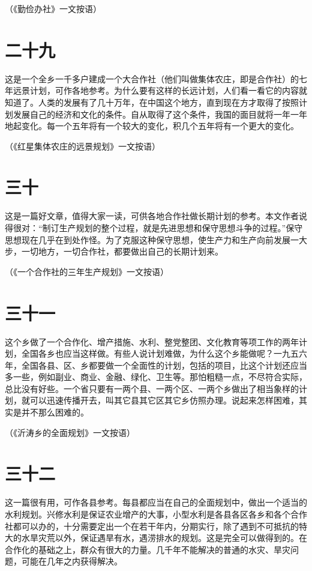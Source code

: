 （《勤俭办社》一文按语）

\section*{二十九}

这是一个全乡一千多户建成一个大合作社（他们叫做集体农庄，即是合作社）的七年远景计划，可作各地参考。为什么要有这样的长远计划，人们看一看它的内容就知道了。人类的发展有了几十万年，在中国这个地方，直到现在方才取得了按照计划发展自己的经济和文化的条件。自从取得了这个条件，我国的面目就将一年一年地起变化。每一个五年将有一个较大的变化，积几个五年将有一个更大的变化。


（《红星集体农庄的远景规划》一文按语）

\section*{三十}

这是一篇好文章，值得大家一读，可供各地合作社做长期计划的参考。本文作者说得很对：“制订生产规划的整个过程，就是先进思想和保守思想斗争的过程。”保守思想现在几乎在到处作怪。为了克服这种保守思想，使生产力和生产向前发展一大步，一切地方，一切合作社，都要做出自己的长期计划来。


（《一个合作社的三年生产规划》一文按语）

\section*{三十一}

这个乡做了一个合作化、增产措施、水利、整党整团、文化教育等项工作的两年计划，全国各乡也应当这样做。有些人说计划难做，为什么这个乡能做呢？一九五六年，全国各县、区、乡都要做一个全面性的计划，包括的项目，比这个计划还应当多一些，例如副业、商业、金融、绿化、卫生等。那怕粗糙一点，不尽符合实际，总比没有好些。一个省只要有一两个县、一两个区、一两个乡做出了相当象样的计划，就可以迅速传播开去，叫其它县其它区其它乡仿照办理。说起来怎样困难，其实是并不那么困难的。


（《沂涛乡的全面规划》一文按语）

\section*{三十二}

这一篇很有用，可作各县参考。每县都应当在自己的全面规划中，做出一个适当的水利规划。兴修水利是保证农业增产的大事，小型水利是各县各区各乡和各个合作社都可以办的，十分需要定出一个在若干年内，分期实行，除了遇到不可抵抗的特大的水旱灾荒以外，保证遇旱有水，遇涝排水的规划。这是完全可以做得到的。在合作化的基础之上，群众有很大的力量。几千年不能解决的普通的水灾、旱灾问题，可能在几年之内获得解决。



